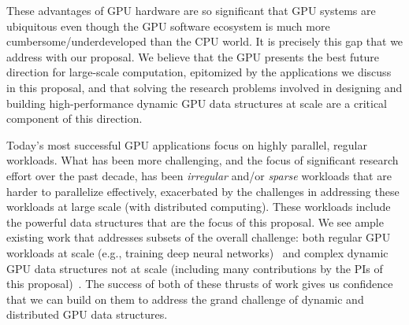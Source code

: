 These advantages of GPU hardware are so significant that GPU systems are
ubiquitous even though the GPU software ecosystem is much more
cumbersome/underdeveloped than the CPU world. It is precisely this gap that we
address with our proposal. We believe that the GPU presents the best future
direction for large-scale computation, epitomized by the applications we
discuss in this proposal, and that solving the research problems involved in
designing and building high-performance dynamic GPU data structures at scale
are a critical component of this direction.


 Today's most successful GPU applications focus on
highly parallel, regular workloads. What has been more challenging, and the
focus of significant research effort over the past decade, has been
\emph{irregular} and/or \emph{sparse} workloads that are harder to parallelize
effectively, exacerbated by the challenges in addressing these workloads at
large scale (with distributed computing). These workloads include the powerful
data structures that are the focus of this proposal. We see ample existing work
that addresses subsets of the overall challenge: both regular GPU workloads at
scale (e.g., training deep neural networks)~ and complex dynamic GPU data
structures not at scale (including many contributions by the PIs of this
proposal)~. The success of both of these thrusts of work gives us confidence
that we can build on them to address the grand challenge of dynamic and
distributed GPU data structures.





